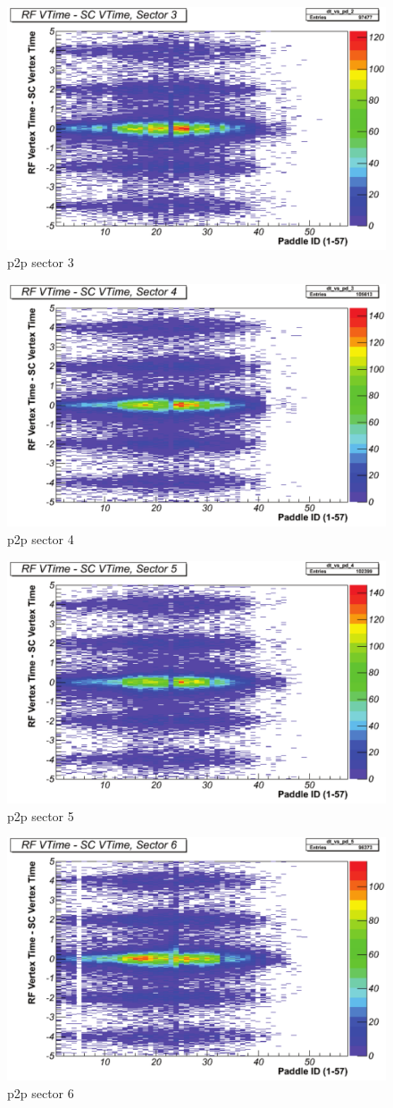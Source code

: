 \begin{figure}\begin{center}
    \includegraphics[width=.40\linewidth]{figures/calib/tof/Tof_56855_final_s3p2p.pdf}
    \caption{p2p sector 3}
    \label{plt:tofsec3}
\end{center}\end{figure}

\begin{figure}\begin{center}
    \includegraphics[width=.40\linewidth]{figures/calib/tof/Tof_56855_final_s4p2p.pdf}
    \caption{p2p sector 4}
    \label{plt:tofsec4}
\end{center}\end{figure}

\begin{figure}\begin{center}
    \includegraphics[width=.40\linewidth]{figures/calib/tof/Tof_56855_final_s5p2p.pdf}
    \caption{p2p sector 5}
    \label{plt:tofsec5}
\end{center}\end{figure}

\begin{figure}\begin{center}
    \includegraphics[width=.40\linewidth]{figures/calib/tof/Tof_56855_final_s6p2p.pdf}
    \caption{p2p sector 6}
    \label{plt:tofsec6}
\end{center}\end{figure}

